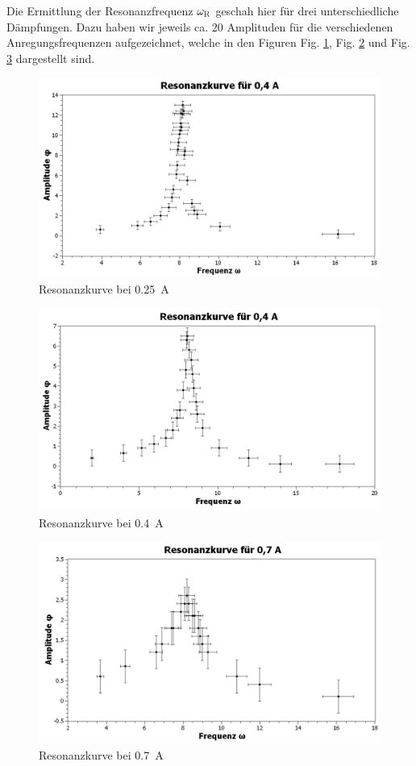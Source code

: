 \documentclass[11pt,a4paper,titlepage, ngerman]{article}
\newcommand{\reffig}[1]{Fig. \ref{fig:#1}}
\begin{document}
			Die Ermittlung der Resonanzfrequenz  $\omega_\textsc{R}$ geschah hier für drei unterschiedliche Dämpfungen. Dazu haben wir jeweils ca. 20 Amplituden für die verschiedenen Anregungsfrequenzen aufgezeichnet, welche in den Figuren \reffig{Resonanz1}, \reffig{Resonanz2} und \reffig{Resonanz3} dargestellt sind. 
			\begin{figure}[ht]
				\includegraphics[width=\textwidth]{Resonanzkurve0,25A.png}
				\caption{Resonanzkurve bei \SI{0,25}{\A}}
				\label{fig:Resonanz1}
			\end{figure}
			\begin{figure}[ht]
				\includegraphics[width=\textwidth]{Resonanzkurve0,4A.png}
				\caption{Resonanzkurve bei \SI{0,4}{\A}}
				\label{fig:Resonanz2}
			\end{figure}		
			\begin{figure}[ht]
				\includegraphics[width=\textwidth]{Resonanzkurve0,7A.png}
				\caption{Resonanzkurve bei \SI{0,7}{\A}}
				\label{fig:Resonanz3}
			\end{figure}
\end{document}
